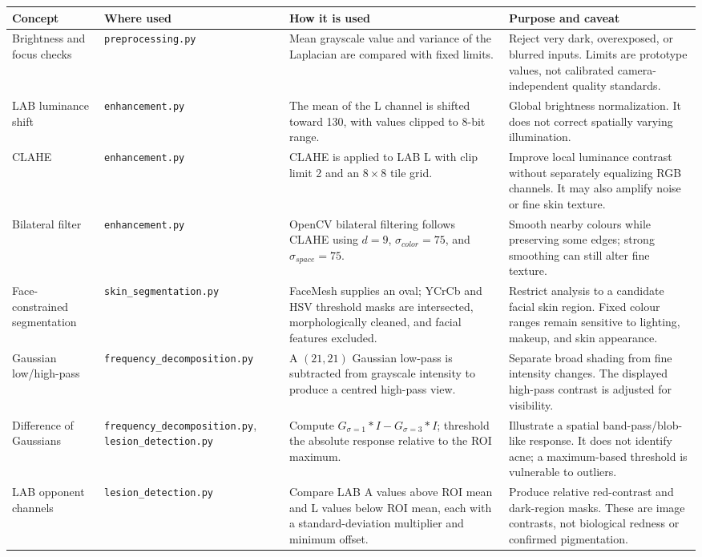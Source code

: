 \documentclass[11pt,a4paper]{article}
\begin{document}
\small
\begin{tabularx}{\textwidth}{@{}p{}p{}X p{}@{}}
\toprule
\textbf{Concept} & \textbf{Where used} & \textbf{How it is used} & \textbf{Purpose and caveat} \\
\midrule
Brightness and focus checks & \texttt{preprocessing.py} & Mean grayscale value and variance of the Laplacian are compared with fixed limits. & Reject very dark, overexposed, or blurred inputs. Limits are prototype values, not calibrated camera-independent quality standards. \\
LAB luminance shift & \texttt{enhancement.py} & The mean of the L channel is shifted toward 130, with values clipped to 8-bit range. & Global brightness normalization. It does not correct spatially varying illumination. \\
CLAHE & \texttt{enhancement.py} & CLAHE is applied to LAB L with clip limit 2 and an $8\times8$ tile grid. & Improve local luminance contrast without separately equalizing RGB channels. It may also amplify noise or fine skin texture. \\
Bilateral filter & \texttt{enhancement.py} & OpenCV bilateral filtering follows CLAHE using $d=9$, $\sigma_{color}=75$, and $\sigma_{space}=75$. & Smooth nearby colours while preserving some edges; strong smoothing can still alter fine texture. \\
Face-constrained segmentation & \texttt{skin\_segmentation.py} & FaceMesh supplies an oval; YCrCb and HSV threshold masks are intersected, morphologically cleaned, and facial features excluded. & Restrict analysis to a candidate facial skin region. Fixed colour ranges remain sensitive to lighting, makeup, and skin appearance. \\
Gaussian low/high-pass & \texttt{frequency\_decomposition.py} & A $(21,21)$ Gaussian low-pass is subtracted from grayscale intensity to produce a centred high-pass view. & Separate broad shading from fine intensity changes. The displayed high-pass contrast is adjusted for visibility. \\
Difference of Gaussians & \texttt{frequency\_decomposition.py}, \texttt{lesion\_detection.py} & Compute $G_{\sigma=1}*I-G_{\sigma=3}*I$; threshold the absolute response relative to the ROI maximum. & Illustrate a spatial band-pass/blob-like response. It does not identify acne; a maximum-based threshold is vulnerable to outliers. \\
LAB opponent channels & \texttt{lesion\_detection.py} & Compare LAB A values above ROI mean and L values below ROI mean, each with a standard-deviation multiplier and minimum offset. & Produce relative red-contrast and dark-region masks. These are image contrasts, not biological redness or confirmed pigmentation. \\

\end{tabularx}
\end{document}
